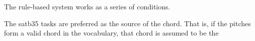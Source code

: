 
The rule-based system works as a series of conditions.

The \gls{satb35} tasks are preferred as the source of the
chord. That is, if the pitches form a valid chord in the vocabulary, that chord is assumed to be the 
